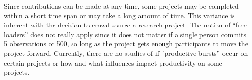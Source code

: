 \noindent Since contributions can be made at any time, some projects may be completed within a short time span or may take a long amount of time. This variance is inherent with the decision to crowd-source a research project. The notion of “free loaders” does not really apply since it does not matter if a single person commits 5 observations or 500, so long as the project gets enough participants to move the project forward. Currently, there are no studies of if “productive bursts” occur on certain projects or how and what influences impact productivity on some projects.
